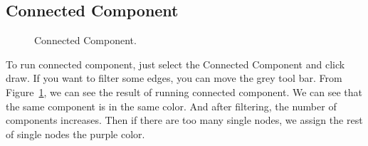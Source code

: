 \documentclass{article}
\begin{document}
 \subsection{Connected Component}
\begin{figure}[htb]
\centering
{}
   \caption{Connected Component.}
    \label{fig:connected component}
\end{figure}
To run connected component, just select the Connected Component and click draw. If you want to filter some edges, you can move the grey tool bar. From Figure~\ref{fig:connected component}, we can see the result of running connected component. We can see that the same component is in the same color. And after filtering, the number of components increases. Then if there are too many single nodes, we assign the rest of single nodes the purple color.\\ 
\end{document}
